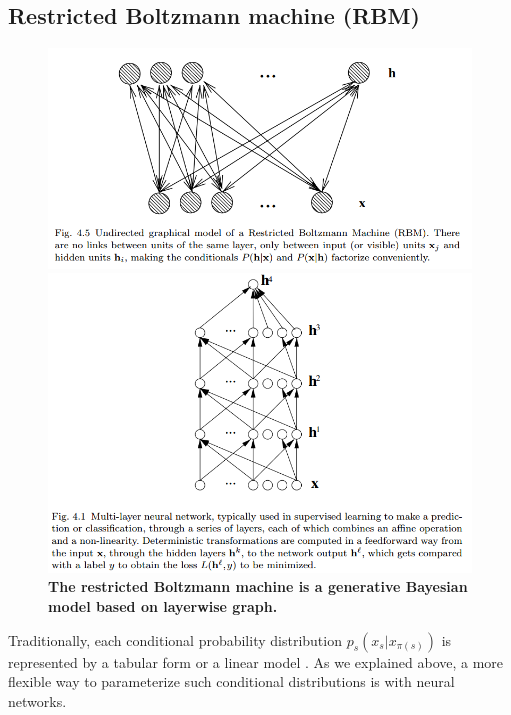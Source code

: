\documentclass[11pt]{article}
\begin{document}
\subsection{Restricted Boltzmann machine (RBM)}
\begin{figure}
\begin{minipage}[t]{0.5\linewidth}
  \centering
  \centerline{\includegraphics[scale = 0.3]{rbm.png}}
\end{minipage}
\begin{minipage}[t]{0.5\linewidth}
  \centering
  \centerline{\includegraphics[scale = 0.3]{ffn.png}}
\end{minipage}
\caption{\footnotesize{\textbf{The restricted Boltzmann machine is a generative Bayesian model based on layerwise graph. \citep{bengio2009learning}
}}}
\label{fig: rbm}
\end{figure}

Traditionally, each conditional probability distribution $p_s(x_s | x_{\pi(s)})$ is represented by a tabular form or a linear model  \citep{koller2009probabilistic}. As we explained above, a more flexible way to parameterize such conditional distributions is with neural networks. 
\end{document}
